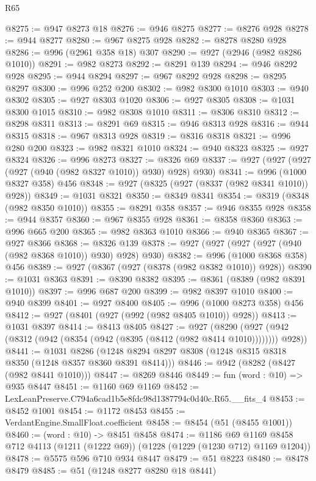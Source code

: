 \begin{lexlean}{R65}
\begin{coremodule}
@8275 := @947 @8273 @18
@8276 := @946 @8275
@8277 := @8276 @928
@8278 := @944 @8277
@8280 := @967 @8275 @928
@8282 := @8278 @8280 @928
@8286 := @996 (@2961 @358 @18) @307
@8290 := @927 (@2946 (@982 @8286 @1010))
@8291 := @982 @8273
@8292 := @8291 @139
@8294 := @946 @8292 @928
@8295 := @944 @8294
@8297 := @967 @8292 @928
@8298 := @8295 @8297
@8300 := @996 @252 @200
@8302 := @982 @8300 @1010
@8303 := @940 @8302
@8305 := @927 @8303 @1020
@8306 := @927 @8305
@8308 := @1031 @8300 @1015
@8310 := @982 @8308 @1010
@8311 := @8306 @8310
@8312 := @8298 @8311
@8313 := @8291 @69
@8315 := @946 @8313 @928
@8316 := @944 @8315
@8318 := @967 @8313 @928
@8319 := @8316 @8318
@8321 := @996 @280 @200
@8323 := @982 @8321 @1010
@8324 := @940 @8323
@8325 := @927 @8324
@8326 := @996 @8273
@8327 := @8326 @69
@8337 := @927 (@927 (@927 (@927 (@940 (@982 @8327 @1010)) @930) @928) @930)
@8341 := @996 (@1000 @8327 @358) @456
@8348 := @927 (@8325 (@927 (@8337 (@982 @8341 @1010)) @928))
@8349 := @1031 @8321
@8350 := @8349 @8341
@8354 := @8319 (@8348 (@982 @8350 @1010))
@8355 := @8291 @358
@8357 := @946 @8355 @928
@8358 := @944 @8357
@8360 := @967 @8355 @928
@8361 := @8358 @8360
@8363 := @996 @665 @200
@8365 := @982 @8363 @1010
@8366 := @940 @8365
@8367 := @927 @8366
@8368 := @8326 @139
@8378 := @927 (@927 (@927 (@927 (@940 (@982 @8368 @1010)) @930) @928) @930)
@8382 := @996 (@1000 @8368 @358) @456
@8389 := @927 (@8367 (@927 (@8378 (@982 @8382 @1010)) @928))
@8390 := @1031 @8363
@8391 := @8390 @8382
@8395 := @8361 (@8389 (@982 @8391 @1010))
@8397 := @996 @687 @200
@8399 := @982 @8397 @1010
@8400 := @940 @8399
@8401 := @927 @8400
@8405 := @996 (@1000 @8273 @358) @456
@8412 := @927 (@8401 (@927 (@992 (@982 @8405 @1010)) @928))
@8413 := @1031 @8397
@8414 := @8413 @8405
@8427 := @927
    (@8290 (@927 (@942 (@8312 (@942 (@8354 (@942 (@8395 (@8412 (@982 @8414 @1010)))))))) @928))
@8441 := @1031
    @8286
    (@1248 @8294 @8297 @8308 (@1248 @8315 @8318 @8350 (@1248 @8357 @8360 @8391 @8414)))
@8446 := @942 (@8282 (@8427 (@982 @8441 @1010)))
@8447 := @8269 @8446
@8449 := fun (word : @10) => @935 @8447
@8451 := @1160 @69 @1169
@8452 := LexLeanPreserve.C794a6cad1b5e8fdc98d1387794c0d40c.R65.__fits_4
@8453 := @8452 @1001
@8454 := @1172 @8453
@8455 := VerdantEngine.SmallFloat.coefficient
@8458 := @8454 (@51 (@8455 @1001))
@8460 := (word : @10) -> @8451 @8458
@8474 := @1186
    @69
    @1169
    @8458
    @712
    @4113
    (@1211 (@1222 @69))
    (@1228 (@1229 (@1230 @712) @1169 @1204))
@8478 := @5575 @596 @710 @934 @8447
@8479 := @51 @8223
@8480 := @8478 @8479
@8485 := @51 (@1248 @8277 @8280 @18 @8441)

\end{coremodule}
\end{lexlean}
